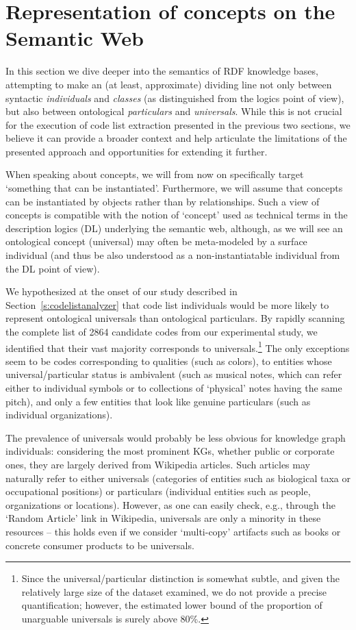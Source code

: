 \section{Representation of concepts on the Semantic Web}
\label{s:repr}

In this section we dive deeper into the semantics of RDF knowledge bases, attempting to make an (at least, approximate) dividing line not only between syntactic \textit{individuals} and \textit{classes} (as distinguished from the logics point of view), but also between ontological \textit{particulars} and \textit{universals}.
While this is not crucial for the execution of code list extraction presented in the previous two sections, we believe it can provide a broader context and help articulate the limitations of the presented approach and opportunities for extending it further.

When speaking about concepts, we will from now on specifically target `something that can be instantiated'.
Furthermore, we will assume that concepts can be instantiated by objects rather than by relationships.
Such a view of concepts is compatible with the notion of `concept' used as technical terms in the description logics (DL) underlying the semantic web, although, as we will see an ontological concept (universal) may often be meta-modeled by a surface individual (and thus be also understood as a non-instantiatable individual from the DL point of view).

We hypothesized at the onset of our study described in Section~\ref{s:codelistanalyzer} that code list individuals would be more likely to represent ontological universals than ontological particulars.
By rapidly scanning the complete list of 2864 candidate codes from our experimental study, we identified that their vast majority corresponds to universals.\footnote{Since the universal/particular distinction is somewhat subtle, and given the relatively large size of the dataset examined, we do not provide a precise quantification; however, the estimated lower bound of the proportion of unarguable universals is surely above 80\%.} 
The only exceptions seem to be codes corresponding to qualities (such as colors), to entities whose universal/particular status is ambivalent (such as musical notes, which can refer either to individual symbols or to collections of `physical' notes having the same pitch), and only a few entities that look like genuine particulars (such as individual organizations). 

The prevalence of universals would probably be less obvious for knowledge graph individuals: considering the most prominent KGs, whether public or corporate ones, they are largely derived from Wikipedia articles.
Such articles may naturally refer to either universals (categories of entities such as biological taxa or occupational positions) or particulars (individual entities such as people, organizations or locations).
However, as one can easily check, e.g., through the `Random Article' link in Wikipedia, universals are only a minority in these resources -- this holds even if we consider `multi-copy' artifacts such as books or concrete consumer products to be universals. 


